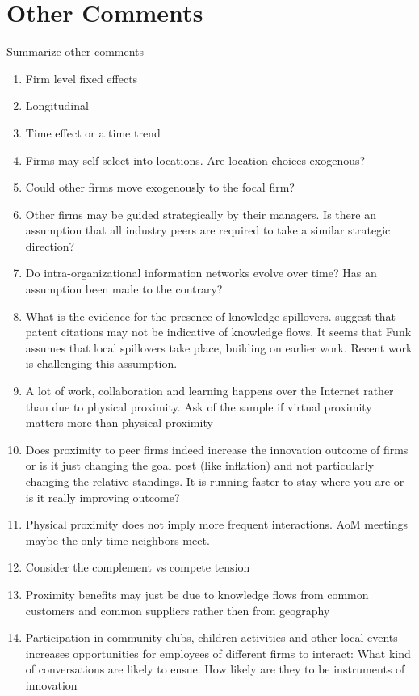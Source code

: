 \documentclass[12pt,letterpaper]{article}
\begin{document}
\section{Other Comments}
Summarize other comments
\begin{enumerate}
  \item Firm level fixed effects
  \item Longitudinal
  \item Time effect or a time trend
  \item Firms may self-select into locations. Are location choices exogenous?
  \item Could other firms move exogenously to the focal firm?
  \item Other firms may be guided strategically by their managers. Is there an assumption that all industry peers are required to take a similar strategic direction?
  \item Do intra-organizational information networks evolve over time? Has an assumption been made to the contrary?
  \item What is the evidence for the presence of knowledge spillovers. \cite{Arora2017a} suggest that patent citations may not be indicative of knowledge flows. It seems that Funk assumes that local spillovers take place, building on earlier work. Recent work is challenging this assumption.
  \item A lot of work, collaboration and learning happens over the Internet rather than due to physical proximity. Ask of the sample if virtual proximity matters more than physical proximity
  \item Does proximity to peer firms indeed increase the innovation outcome of firms or is it just changing the goal post (like inflation) and not particularly changing the relative standings. It is running faster to stay where you are or is it really improving outcome?
  \item Physical proximity does not imply more frequent interactions. AoM meetings maybe the only time neighbors meet.
  \item Consider the complement vs compete tension
  \item Proximity benefits may just be due to knowledge flows from common customers and common suppliers rather then from geography
  \item Participation in community clubs, children activities and other local events increases opportunities for employees of different firms to interact: What kind of conversations are likely to ensue. How likely are they to be instruments of innovation

\end{enumerate}
\end{document}
